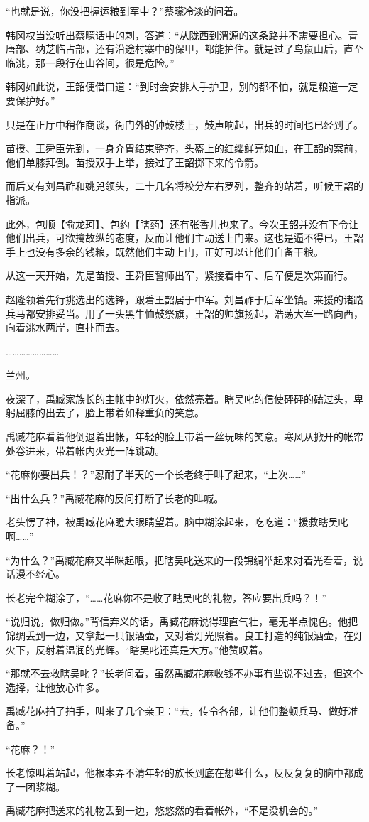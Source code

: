 “也就是说，你没把握运粮到军中？”蔡曚冷淡的问着。

韩冈权当没听出蔡曚话中的刺，答道：“从陇西到渭源的这条路并不需要担心。青唐部、纳芝临占部，还有沿途村寨中的保甲，都能护住。就是过了鸟鼠山后，直至临洮，那一段行在山谷间，很是危险。”

韩冈如此说，王韶便借口道：“到时会安排人手护卫，别的都不怕，就是粮道一定要保护好。”

只是在正厅中稍作商谈，衙门外的钟鼓楼上，鼓声响起，出兵的时间也已经到了。

苗授、王舜臣先到，一身介胄结束整齐，头盔上的红缨鲜亮如血，在王韶的案前，他们单膝拜倒。苗授双手上举，接过了王韶掷下来的令箭。

而后又有刘昌祚和姚兕领头，二十几名将校分左右罗列，整齐的站着，听候王韶的指派。

此外，包顺【俞龙珂】、包约【瞎药】还有张香儿也来了。今次王韶并没有下令让他们出兵，可欲擒故纵的态度，反而让他们主动送上门来。这也是逼不得已，王韶手上也没有多余的钱粮，既然他们主动上门，正好可以让他们自备干粮。

从这一天开始，先是苗授、王舜臣誓师出军，紧接着中军、后军便是次第而行。

赵隆领着先行挑选出的选锋，跟着王韶居于中军。刘昌祚于后军坐镇。来援的诸路兵马都安排妥当。用了一头黑牛恤鼓祭旗，王韶的帅旗扬起，浩荡大军一路向西，向着洮水两岸，直扑而去。

……………………

兰州。

夜深了，禹臧家族长的主帐中的灯火，依然亮着。瞎吴叱的信使砰砰的磕过头，卑躬屈膝的出去了，脸上带着如释重负的笑意。

禹臧花麻看着他倒退着出帐，年轻的脸上带着一丝玩味的笑意。寒风从掀开的帐帘处卷进来，带着帐内火光一阵跳动。

“花麻你要出兵！？”忍耐了半天的一个长老终于叫了起来，“上次……”

“出什么兵？”禹臧花麻的反问打断了长老的叫喊。

老头愣了神，被禹臧花麻瞪大眼睛望着。脑中糊涂起来，吃吃道：“援救瞎吴叱啊……”

“为什么？”禹臧花麻又半眯起眼，把瞎吴叱送来的一段锦绸举起来对着光看着，说话漫不经心。

长老完全糊涂了，“……花麻你不是收了瞎吴叱的礼物，答应要出兵吗？！”

“说归说，做归做。”背信弃义的话，禹臧花麻说得理直气壮，毫无半点愧色。他把锦绸丢到一边，又拿起一只银酒壶，又对着灯光照着。良工打造的纯银酒壶，在灯火下，反射着温润的光辉。“瞎吴叱还真是大方。”他赞叹着。

“那就不去救瞎吴叱？”长老问着，虽然禹臧花麻收钱不办事有些说不过去，但这个选择，让他放心许多。

禹臧花麻拍了拍手，叫来了几个亲卫：“去，传令各部，让他们整顿兵马、做好准备。”

“花麻？！”

长老惊叫着站起，他根本弄不清年轻的族长到底在想些什么，反反复复的脑中都成了一团浆糊。

禹臧花麻把送来的礼物丢到一边，悠悠然的看着帐外，“不是没机会的。”

